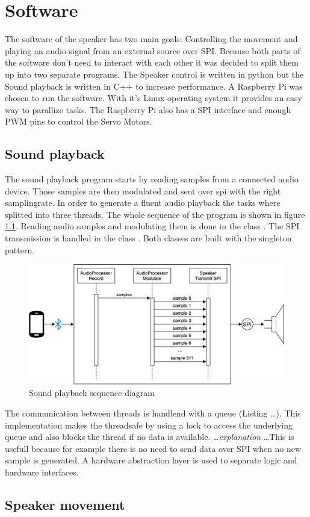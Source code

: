 \chapter{Software}

The software of the speaker has two main goals: Controlling the movement and playing an audio signal from an external source over SPI. Because both parts of the software don't need to interact with each other it was decided to split them up into two separate programs. The Speaker control is written in python but the Sound playback is written in C++ to increase performance.\p
%
A Raspberry Pi was chosen to run the software. With it's Linux operating system it provides an easy way to parallize tasks. The Raspberry Pi also has a SPI interface and enough PWM pins to control the Servo Motors.

\section{Sound playback}

The sound playback program starts by reading samples from a connected audio device. Those samples are then modulated and sent over spi with the right samplingrate. In order to generate a fluent audio playback the tasks where splitted into three threads. The whole sequence of the program is shown in figure \ref{fig:software:sound_sequence}.\p
Reading audio samples and modulating them is done in the class . The SPI transmission is handled in the class . Both classes are built with the singleton pattern.
%
\begin{figure}
  \centering
  \includegraphics[width=\textwidth]{src/assets/pictures/software/sequence_diagramm.png}
  \caption{Sound playback sequence diagram}\label{fig:software:sound_sequence}
\end{figure}
%
The communication between threads is handlend with a queue (Listing \dots). This implementation makes the  threadsafe by using a lock to access the underlying queue and also blocks the thread if no data is available. \dots \textit{explanation} \dots This is usefull because for example there is no need to send data over SPI when no new sample is generated.\p
%
A hardware abstraction layer is used to separate logic and hardware interfaces.





\section{Speaker movement}
